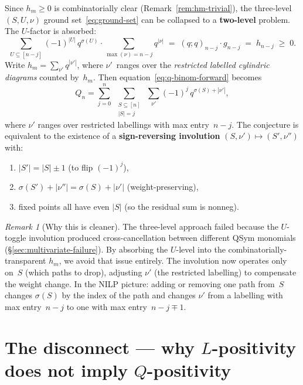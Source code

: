 \documentclass[11pt]{article}
\theoremstyle{plain}
\theoremstyle{definition}
\theoremstyle{remark}
\newtheorem{remark}[theorem]{Remark}
\newcommand{\qpochn}[3]{(#1;#2)_{#3}}
\begin{document}
Since $h_m \geq 0$ is combinatorially clear
(Remark~\ref{rem:hm-trivial}), the three-level $(S,U,\nu)$
ground set~\eqref{eq:ground-set} can be collapsed to a
\textbf{two-level} problem.
The $U$-factor is absorbed:
\[
  \sum_{U \subseteq [n-j]} (-1)^{|U|}\, q^{\sigma(U)}
  \cdot \sum_{\max(\nu) = n-j} q^{|\nu|}
  \;=\; \qpochn{q}{q}{n-j} \cdot g_{n-j}
  \;=\; h_{n-j} \;\geq\; 0.
\]
Write $h_m = \sum_{\nu'} q^{|\nu'|}$, where $\nu'$~ranges over
the \emph{restricted labelled cylindric diagrams} counted by~$h_m$.
Then equation~\eqref{eq:q-binom-forward} becomes
\begin{equation}\label{eq:two-level}
  Q_n = \sum_{j=0}^{n}\;
  \sum_{\substack{S \subseteq [n] \\ |S| = j}}\;
  \sum_{\nu'}
  (-1)^j\, q^{\sigma(S) + |\nu'|},
\end{equation}
where $\nu'$ ranges over restricted labellings with
max entry~$n - j$.
The conjecture is equivalent to the existence of a
\textbf{sign-reversing involution}
$(S, \nu') \mapsto (S', \nu'')$
with:
\begin{enumerate}
  \item $|S'| = |S| \pm 1$ (to flip $(-1)^j$),
  \item $\sigma(S') + |\nu''| = \sigma(S) + |\nu'|$
    (weight-preserving),
  \item fixed points all have even $|S|$
    (so the residual sum is nonneg).
\end{enumerate}

\begin{remark}[Why this is cleaner]
The three-level approach failed because the $U$-toggle involution
produced cross-cancellation between different QSym monomials
(\S\ref{sec:multivariate-failure}).  By absorbing the $U$-level
into the combinatorially-transparent $h_m$, we avoid that issue
entirely.  The involution now operates only on~$S$ (which paths
to drop), adjusting $\nu'$ (the restricted labelling) to
compensate the weight change.  In the NILP picture:
adding or removing one path from~$S$ changes $\sigma(S)$
by the index of the path and changes $\nu'$ from a labelling
with max entry~$n-j$ to one with max entry~$n-j \mp 1$.
\end{remark}


\section{The disconnect --- why $L$-positivity does not imply $Q$-positivity}
\label{sec:disconnect}
\end{document}
